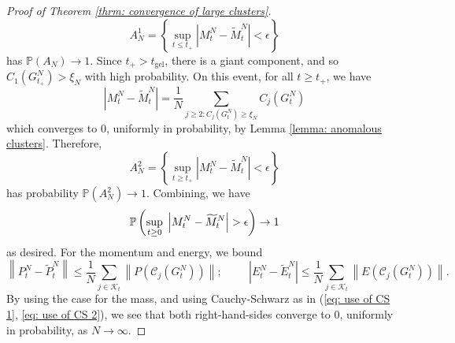 \begin{proof}[Proof of Theorem \ref{thrm: convergence of large clusters}]
\begin{equation}
          A^1_N=\left\{\sup_{t\le t_+} \left|M^N_t-\widetilde{M}^N_t\right|<\epsilon\right\}
      \end{equation} has $\mathbb{P}(A_N)\rightarrow 1.$ Since $t_+>t_\text{gel}$, there is a giant component, and so $C_1(G^N_{t_+})>\xi_N$ with high probability. On this event, for all $t\ge t_+$, we have \begin{equation}
          \left|M^N_t-\widetilde{M}^N_t\right|=\frac{1}{N}\sum_{j\ge 2: C_j(G^N_t)\ge \xi_N} C_j(G^N_t)
      \end{equation} which converges to $0$, uniformly in probability, by Lemma \ref{lemma: anomalous clusters}. Therefore, \begin{equation}
          A^2_N=\left\{\sup_{t\ge t_+} \left|M^N_t-\widetilde{M}^N_t\right|<\epsilon \right\}
      \end{equation} has probability $\mathbb{P}(A^2_N)\rightarrow 1$. Combining, we have \begin{equation}
          \mathbb{P}\left(\sup_{t\ge 0}\hspace{0.1cm}\left|M^N_t-\widetilde{M}^N_t\right|>\epsilon\right)\rightarrow 1
      \end{equation} as desired. For the momentum and energy, we bound \begin{equation}
          \left\| P^N_t-\widetilde{P}^N_t \right\| \le \frac{1}{N} \sum_{j\in\mathcal{K}_t} \left\|P\left(\mathcal{C}_j(G^N_t)\right)\right\|;\hspace{1cm}\left| E^N_t-\widetilde{E}^N_t \right| \le \frac{1}{N} \sum_{j\in\mathcal{K}_t} \left\|E\left(\mathcal{C}_j(G^N_t)\right)\right\|.
      \end{equation} By using the case for the mass, and using Cauchy-Schwarz as in (\ref{eq: use of CS 1}, \ref{eq: use of CS 2}), we see that both right-hand-sides converge to $0$, uniformly in probability, as $N\rightarrow \infty.$ \end{proof}
   
   
  